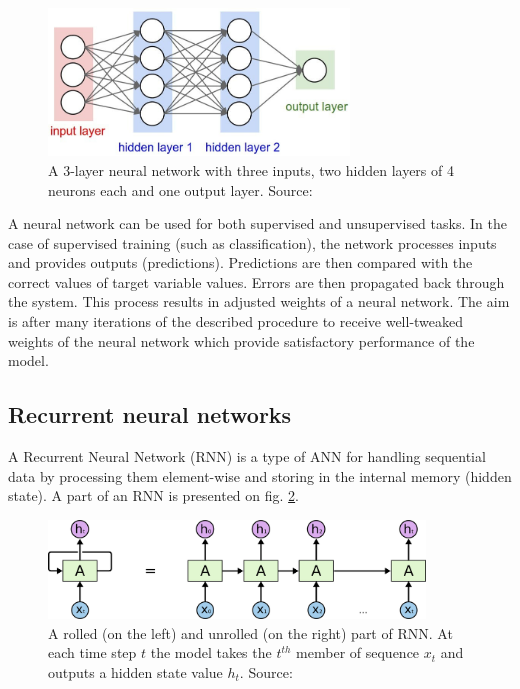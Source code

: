 \begin{figure}[h]
    \centering
    \includegraphics[width=8cm]{Images/Neural-network.jpg}
    \caption{A 3-layer neural network with three inputs, two hidden layers of 4 neurons each and one output layer. Source: \citep{FeiFei-2016}}
    \label{fig:neural-net}
\end{figure} 

A neural network can be used for both supervised and unsupervised tasks. In the case of supervised training (such as classification), the network processes inputs and provides outputs (predictions). Predictions are then compared with the correct values of target variable values. Errors are then propagated back through the system. This process results in adjusted weights of a neural network. The aim is after many iterations of the described procedure to receive well-tweaked weights of the neural network which provide satisfactory performance of the model.

\subsection{Recurrent neural networks}
\label{sec:rnn}
A Recurrent Neural Network (RNN) is a type of ANN for handling sequential data by processing them element-wise and storing in the internal memory (hidden state). A part of an RNN is presented on fig. \ref{fig:rnn}.

\begin{figure}[h]
    \centering
    \includegraphics[width=10cm]{Images/RNN-unrolled.png}
    \caption{A rolled (on the left) and unrolled (on the right) part of RNN. At each time step $t$ the model takes the $t^{th}$ member of sequence $x_t$ and outputs a hidden state value $h_t$. Source: \citep{Olah-2015}}
    \label{fig:rnn}
\end{figure} 

